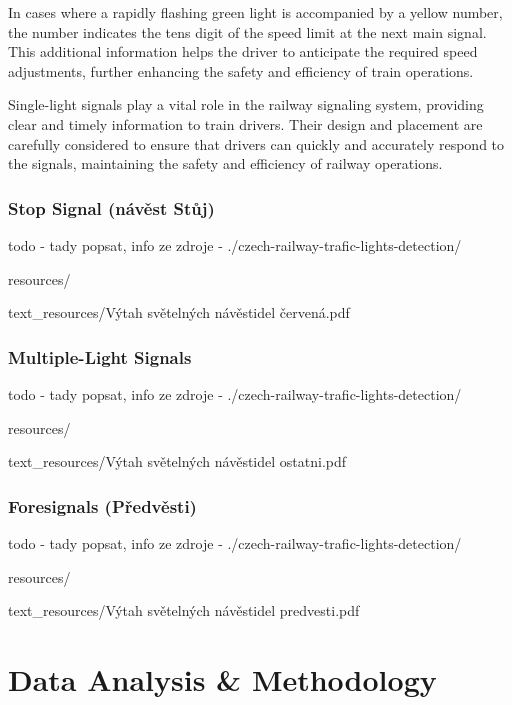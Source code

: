 \documentclass[english, ing, kiv, he, iso690alph, pdf, viewonly]{fasthesis}
\begin{document}
In cases where a rapidly flashing green light is accompanied by a yellow number, the number indicates the tens digit of the speed limit at the next main signal. This additional information helps the driver to anticipate the required speed adjustments, further enhancing the safety and efficiency of train operations.

Single-light signals play a vital role in the railway signaling system, providing clear and timely information to train drivers. Their design and placement are carefully considered to ensure that drivers can quickly and accurately respond to the signals, maintaining the safety and efficiency of railway operations.






\newpage
\subsection{Stop Signal (návěst Stůj)}

todo - tady popsat, info ze zdroje - ./czech-railway-trafic-lights-detection/

resources/

text\_resources/Výtah světelných návěstidel červená.pdf 




\newpage
\subsection{Multiple-Light Signals}
todo - tady popsat, info ze zdroje - ./czech-railway-trafic-lights-detection/

resources/

text\_resources/Výtah světelných návěstidel ostatni.pdf 



\newpage
\subsection{Foresignals (Předvěsti)}
todo - tady popsat, info ze zdroje - ./czech-railway-trafic-lights-detection/

resources/

text\_resources/Výtah světelných návěstidel predvesti.pdf 






\chapter{Data Analysis \& Methodology}
\end{document}
